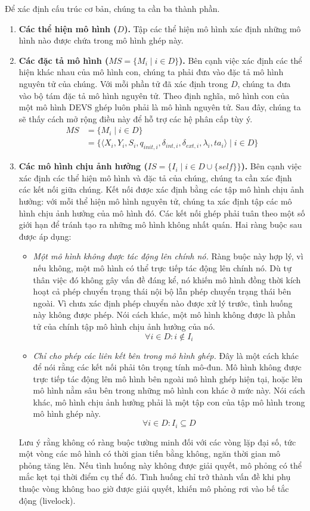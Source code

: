 Để xác định cấu trúc cơ bản, chúng ta cần ba thành phần.
\begin{enumerate}
\item \textbf{Các thể hiện mô hình ($D$).} Tập các thể hiện mô hình xác định những mô hình nào được chứa trong mô hình ghép này.
\item \textbf{Các đặc tả mô hình ($MS=\{M_i\mid i\in D\}$).} Bên cạnh việc xác định các thể hiện khác nhau của mô hình con, chúng ta phải đưa vào đặc tả mô hình nguyên tử của chúng. Với mỗi phần tử đã xác định trong $D$, chúng ta đưa vào bộ tám đặc tả mô hình nguyên tử. Theo định nghĩa, mô hình con của một mô hình DEVS ghép luôn phải là mô hình nguyên tử. Sau đây, chúng ta sẽ thấy cách mở rộng điều này để hỗ trợ các hệ phân cấp tùy ý.
\begin{align*}
MS &= \{M_i\mid i\in D\}\\
   &= \{\langle X_i,Y_i,S_i,q_{init,i},\delta_{int,i},\delta_{ext,i},\lambda_i,ta_i\rangle\mid i\in D\}
\end{align*}
\item \textbf{Các mô hình chịu ảnh hưởng ($IS=\{I_i\mid i\in D\cup\{self\}\}$).} Bên cạnh việc xác định các thể hiện mô hình và đặc tả của chúng, chúng ta cần xác định các kết nối giữa chúng. Kết nối được xác định bằng các tập mô hình chịu ảnh hưởng: với mỗi thể hiện mô hình nguyên tử, chúng ta xác định
tập các mô hình chịu ảnh hưởng của mô hình đó. Các kết nối ghép phải tuân theo một số giới hạn để tránh tạo ra những mô hình không nhất quán. Hai ràng buộc sau được áp dụng:
\begin{itemize}
\item \emph{Một mô hình không được tác động lên chính nó.} Ràng buộc này hợp lý, vì nếu không, một mô hình có thể trực tiếp tác động lên chính nó. Dù tự thân việc đó không gây vấn đề đáng kể, nó khiến mô hình đồng thời kích hoạt cả phép chuyển trạng thái nội bộ lẫn phép chuyển trạng thái bên ngoài. Vì chưa xác định phép chuyển nào được xử lý trước, tình huống này không được phép. Nói cách khác, một mô hình không được là phần tử của chính tập mô hình chịu ảnh hưởng của nó.
\[
\forall i\in D:i\notin I_i
\]
\item \emph{Chỉ cho phép các liên kết bên trong mô hình ghép.} Đây là một cách khác để nói rằng các kết nối phải tôn trọng tính mô-đun. Mô hình không được trực tiếp tác động lên mô hình bên ngoài mô hình ghép hiện tại, hoặc lên mô hình nằm sâu bên trong những mô hình con khác ở mức này. Nói cách khác, mô hình chịu ảnh hưởng phải là một tập con của tập mô hình trong mô hình ghép này.
\[
\forall i\in D:I_i\subseteq D
\]
\end{itemize}

Lưu ý rằng không có ràng buộc tường minh đối với các vòng lặp đại số, tức một vòng các mô hình có thời gian tiến bằng không, ngăn thời gian mô phỏng tăng lên. Nếu tình huống này không được giải quyết, mô phỏng có thể mắc kẹt tại thời điểm cụ thể đó. Tình huống chỉ trở thành vấn đề khi phụ thuộc vòng không bao giờ được giải quyết, khiến mô phỏng rơi vào bế tắc động (livelock).
\end{enumerate}


